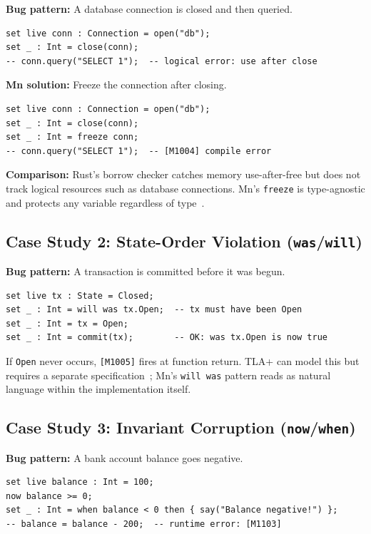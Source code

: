 \documentclass[11pt,a4paper]{article}
\begin{document}
\textbf{Bug pattern:} A database connection is closed and then queried.

\begin{lstlisting}[style=Mn,numbers=none]
set live conn : Connection = open("db");
set _ : Int = close(conn);
-- conn.query("SELECT 1");  -- logical error: use after close
\end{lstlisting}

\textbf{Mn solution:} Freeze the connection after closing.

\begin{lstlisting}[style=Mn,numbers=none]
set live conn : Connection = open("db");
set _ : Int = close(conn);
set _ : Int = freeze conn;
-- conn.query("SELECT 1");  -- [M1004] compile error
\end{lstlisting}

\textbf{Comparison:} Rust's borrow checker catches memory use-after-free but does not track
logical resources such as database connections. Mn's \texttt{freeze} is type-agnostic and
protects any variable regardless of type~\cite{matsakis2014}.

\subsection{Case Study 2: State-Order Violation (\texttt{was}/\texttt{will})}

\textbf{Bug pattern:} A transaction is committed before it was begun.

\begin{lstlisting}[style=Mn,numbers=none]
set live tx : State = Closed;
set _ : Int = will was tx.Open;  -- tx must have been Open
set _ : Int = tx = Open;
set _ : Int = commit(tx);        -- OK: was tx.Open is now true
\end{lstlisting}

If \texttt{Open} never occurs, \texttt{[M1005]} fires at function return. TLA+ can model this
but requires a separate specification~\cite{lamport2002}; Mn's \texttt{will was} pattern reads
as natural language within the implementation itself.

\subsection{Case Study 3: Invariant Corruption (\texttt{now}/\texttt{when})}

\textbf{Bug pattern:} A bank account balance goes negative.

\begin{lstlisting}[style=Mn,numbers=none]
set live balance : Int = 100;
now balance >= 0;
set _ : Int = when balance < 0 then { say("Balance negative!") };
-- balance = balance - 200;  -- runtime error: [M1103]
\end{lstlisting}
\end{document}
